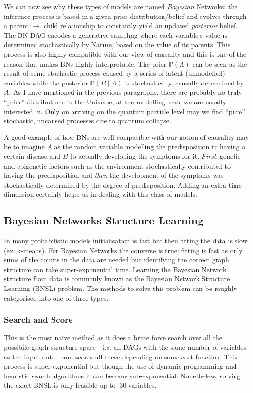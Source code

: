 We can now see why these types of models are named \textit{Bayesian} Networks: the inference process is based in a given prior distribution/belief and evolves through a parent $\rightarrow$ child relationship to constantly yield an updated \textit{posterior} belief.
The BN DAG encodes a generative sampling where each variable's value is determined stochastically by Nature, based on the value of its parents.
This process is also highly compatible with our view of causality and this is one of the reason that makes BNs highly interpretable.
The prior $\mathbb{P}(A)$ can be seen as the result of some stochastic process caused by a series of latent (unmodelled) variables while the posterior $\mathbb{P}(B \mid A)$ is stochastically, causally determined by $A$. 
As I have mentioned in the previous paragraphs, there are probably no truly ``prior'' distributions in the Universe, at the modelling scale we are usually interested in.
Only on arriving on the quantum particle level may we find ``pure'' stochastic, uncaused processes due to quantum collapse.

A good example of how BNs are well compatible with our notion of causality may be to imagine $A$ as the random variable modelling the predisposition to having a certain disease and $B$ to actually developing the symptoms for it.
\textit{First}, genetic and epigenetic factors such as the environment stochastically contributed to having the predisposition and \textit{then} the development of the symptoms was stochastically determined by the degree of predisposition.
Adding an extra time dimension certainly helps us in dealing with this class of models.

\subsection{Bayesian Networks Structure Learning} \label{subsec:bnstructurelearning} 
In many probabilistic models initialisation is fast but then fitting the data is slow (ex. k-means).
For Bayesian Networks the converse is true: fitting is fast as only sums of the counts in the data are needed but identifying the correct graph structure can take super-exponential time.
Learning the Bayesian Network structure from data is commonly known as the Bayesian Network Structure Learning (BNSL) problem.
The methods to solve this problem can be roughly categorised into one of three types.

\subsubsection{Search and Score}
This is the most na{\"i}ve method as it does a brute force search over all the possibile graph structure space - i.e. all DAGs with the same number of variables as the input data - and scores all these depending on some cost function.
This process is super-exponential but though the use of dynamic programming and heuristic search algorithms it can become sub-exponential.
Nonetheless, solving the exact BNSL is only feasible up to $~ 30$ variables.

